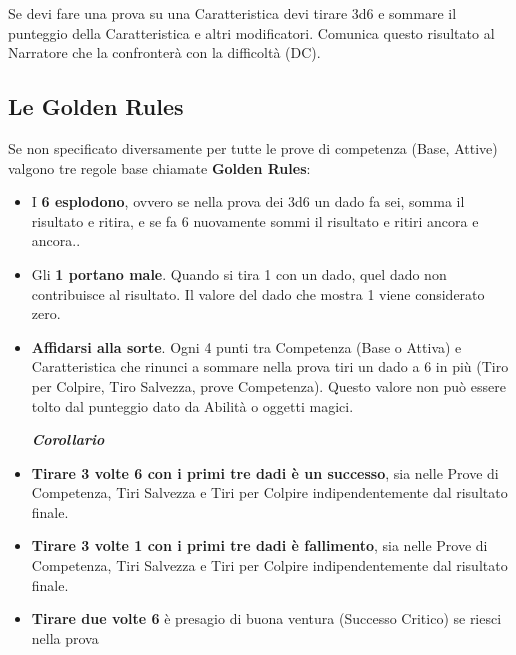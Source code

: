\begin{multicols}{2}
\medskip

Se devi fare una prova su una Caratteristica devi tirare 3d6 e sommare il punteggio della Caratteristica e altri modificatori. Comunica questo risultato al Narratore che la confronterà con la difficoltà (DC).

\subsection{Le Golden Rules}\label{goldenrules}

Se non specificato diversamente per tutte le prove di competenza (Base, Attive) valgono tre regole base  chiamate \textbf{Golden Rules}:

\begin{itemize}[leftmargin=*] \setlength{\itemsep}{0pt}
\item
I \textbf{6 esplodono}, ovvero se nella prova dei 3d6 un dado fa sei, somma il risultato e ritira, e se fa 6 nuovamente sommi il risultato e ritiri ancora e ancora..
\item
Gli \textbf{1 portano male}. Quando si tira 1 con un dado, quel dado non contribuisce al risultato. Il valore del dado che mostra 1 viene considerato zero.
\item
\textbf{Affidarsi alla sorte}. Ogni 4 punti tra Competenza (Base o Attiva) e Caratteristica che rinunci a sommare nella prova tiri un dado a 6 in più (Tiro per Colpire, Tiro Salvezza, prove Competenza). Questo valore non può essere tolto dal punteggio dato da Abilità o oggetti magici.


\begin{center}\textbf{\emph{Corollario}}\end{center}

\item \textbf{Tirare 3 volte 6 con i primi tre dadi è un successo}, sia nelle Prove di Competenza, Tiri Salvezza e Tiri per Colpire indipendentemente dal risultato finale.

\item \textbf{Tirare 3 volte 1 con i primi tre dadi è fallimento}, sia nelle Prove di Competenza, Tiri Salvezza e Tiri per Colpire indipendentemente dal risultato finale. 

\item \textbf{Tirare due volte 6} è presagio di buona ventura (Successo Critico) se riesci nella prova 


\end{itemize}
\end{multicols}
